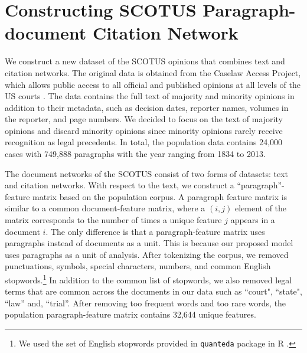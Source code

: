 \section{Constructing SCOTUS Paragraph-document Citation Network}
\label{sec:data}

We construct a new dataset of the SCOTUS opinions that combines text and citation networks. 
The original data is obtained from the Caselaw Access Project, which allows public access to all official and published opinions at all levels of the US courts \citep{caselaw}.
The data contains the full text of majority and minority opinions in addition to their metadata, such as decision dates, reporter names, volumes in the reporter, and page numbers. 
We decided to focus on the text of majority opinions and discard minority opinions since minority opinions rarely receive recognition as legal precedents.
In total, the population data contains 24,000 cases with 749,888 paragraphs with the year ranging from 1834 to 2013. 

The document networks of the SCOTUS consist of two forms of datasets: text and citation networks. 
With respect to the text, we construct a ``paragraph''-feature matrix based on the population corpus. 
A paragraph feature matrix is similar to a common document-feature matrix, where a $(i,j)$ element of the matrix corresponds to the number of times a unique feature $j$ appears in a document $i$.
The only difference is that a paragraph-feature matrix uses paragraphs instead of documents as a unit. 
This is because our proposed model uses paragraphs as a unit of analysis. 
After tokenizing the corpus, we removed punctuations, symbols, special characters, numbers, and common English stopwords.\footnote{We used the set of English stopwords provided in \texttt{quanteda} package in \textsf{R} \citep{quanteda}.}
In addition to the common list of stopwords, we also removed legal terms that are common across the documents in our data such as ``court", ``state", ``law'' and, ``trial''.
After removing too frequent words and too rare words, the population paragraph-feature matrix contains 32,644 unique features.

